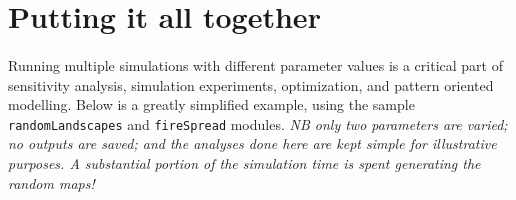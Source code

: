 \documentclass{article}
\begin{document}
\newpage

\section{Putting it all together}

\paragraph{}
Running multiple simulations with different parameter values is a critical part of sensitivity analysis, simulation experiments, optimization, and pattern oriented modelling. Below is a greatly simplified example, using the sample \texttt{randomLandscapes} and \texttt{fireSpread} modules. \textit{NB only two parameters are varied; no outputs are saved; and the analyses done here are kept simple for illustrative purposes. A substantial portion of the simulation time is spent generating the random maps!}
\end{document}
